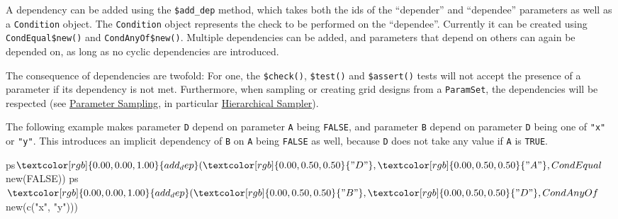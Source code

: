 \documentclass[]{article}
\newenvironment{Shaded}{}{}
\newcommand{\KeywordTok}[1]{\textcolor[rgb]{0.00,0.00,1.00}{#1}}
\newcommand{\NormalTok}[1]{#1}
\newcommand{\OperatorTok}[1]{#1}
\newcommand{\OtherTok}[1]{\textcolor[rgb]{1.00,0.25,0.00}{#1}}
\newcommand{\StringTok}[1]{\textcolor[rgb]{0.00,0.50,0.50}{#1}}
\renewenvironment{Shaded} {\begin{snugshade}\small} {\end{snugshade}}
\begin{document}
A dependency can be added using the \texttt{\$add\_dep} method, which takes both the ids of the ``depender'' and ``dependee'' parameters as well as a \texttt{Condition} object.
The \texttt{Condition} object represents the check to be performed on the ``dependee''.
Currently it can be created using \texttt{CondEqual\$new()} and \texttt{CondAnyOf\$new()}.
Multiple dependencies can be added, and parameters that depend on others can again be depended on, as long as no cyclic dependencies are introduced.

The consequence of dependencies are twofold:
For one, the \texttt{\$check()}, \texttt{\$test()} and \texttt{\$assert()} tests will not accept the presence of a parameter if its dependency is not met.
Furthermore, when sampling or creating grid designs from a \texttt{ParamSet}, the dependencies will be respected (see \protect\hyperlink{parameter-sampling}{Parameter Sampling}, in particular \protect\hyperlink{hierarchical-sampler}{Hierarchical Sampler}).

The following example makes parameter \texttt{D} depend on parameter \texttt{A} being \texttt{FALSE}, and parameter \texttt{B} depend on parameter \texttt{D} being one of \texttt{"x"} or \texttt{"y"}.
This introduces an implicit dependency of \texttt{B} on \texttt{A} being \texttt{FALSE} as well, because \texttt{D} does not take any value if \texttt{A} is \texttt{TRUE}.

\begin{Shaded}
\begin{Highlighting}[]
\NormalTok{ps}\OperatorTok{$}\KeywordTok{add_dep}\NormalTok{(}\StringTok{"D"}\NormalTok{, }\StringTok{"A"}\NormalTok{, CondEqual}\OperatorTok{$}\KeywordTok{new}\NormalTok{(}\OtherTok{FALSE}\NormalTok{))}
\NormalTok{ps}\OperatorTok{$}\KeywordTok{add_dep}\NormalTok{(}\StringTok{"B"}\NormalTok{, }\StringTok{"D"}\NormalTok{, CondAnyOf}\OperatorTok{$}\KeywordTok{new}\NormalTok{(}\KeywordTok{c}\NormalTok{(}\StringTok{"x"}\NormalTok{, }\StringTok{"y"}\NormalTok{)))}
\end{Highlighting}
\end{Shaded}
\end{document}
